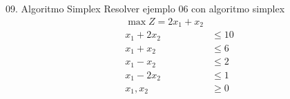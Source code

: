 \begin{frameExample}{09. Algoritmo Simplex}{}
  Resolver ejemplo 06 con algoritmo simplex
    \begin{align*}
      \max Z = 2x_1 + x_2 & \\[3mm]
    x_1 + 2x_2 & \leq 10\\
    x_1 + x_2 & \leq 6\\
    x_1 - x_2 & \leq 2\\
    x_1 - 2x_2 & \leq 1\\[5mm]
    x_1, x_2 & \geq 0
  \end{align*}
\end{frameExample}

